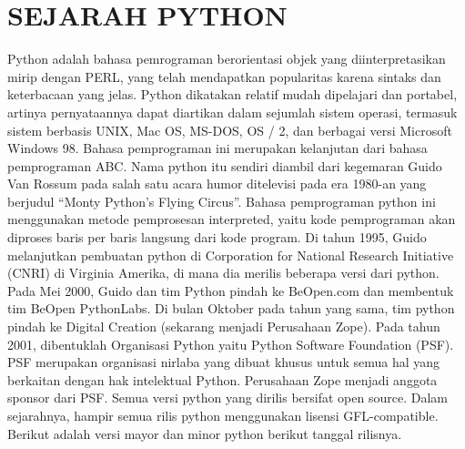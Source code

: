 \chapter*{SEJARAH PYTHON}

\par
	Python adalah bahasa pemrograman berorientasi objek yang diinterpretasikan mirip dengan PERL, yang telah mendapatkan popularitas karena sintaks dan keterbacaan yang jelas. Python dikatakan relatif mudah dipelajari dan portabel, artinya pernyataannya dapat diartikan dalam sejumlah sistem operasi, termasuk sistem berbasis UNIX, Mac OS, MS-DOS, OS / 2, dan berbagai versi Microsoft Windows 98. Bahasa pemprograman ini merupakan kelanjutan dari bahasa pemprograman ABC. Nama python itu sendiri diambil dari kegemaran Guido Van Rossum pada salah satu acara humor ditelevisi pada era 1980-an yang berjudul “Monty Python’s Flying Circus”. Bahasa pemprograman python ini menggunakan metode pemprosesan interpreted, yaitu kode pemprograman akan diproses baris per baris langsung dari kode program. Di tahun 1995, Guido melanjutkan pembuatan python di Corporation for National Research Initiative (CNRI) di Virginia Amerika, di mana dia merilis beberapa versi dari python.
Pada Mei 2000, Guido dan tim Python pindah ke BeOpen.com dan membentuk tim BeOpen PythonLabs. Di bulan Oktober pada tahun yang sama, tim python pindah ke Digital Creation (sekarang menjadi Perusahaan Zope). Pada tahun 2001, dibentuklah Organisasi Python yaitu Python Software Foundation (PSF). PSF merupakan organisasi nirlaba yang dibuat khusus untuk semua hal yang berkaitan dengan hak intelektual Python. Perusahaan Zope menjadi anggota sponsor dari PSF.
Semua versi python yang dirilis bersifat open source. Dalam sejarahnya, hampir semua rilis python menggunakan lisensi GFL-compatible. Berikut adalah versi mayor dan minor python berikut tanggal rilisnya.
